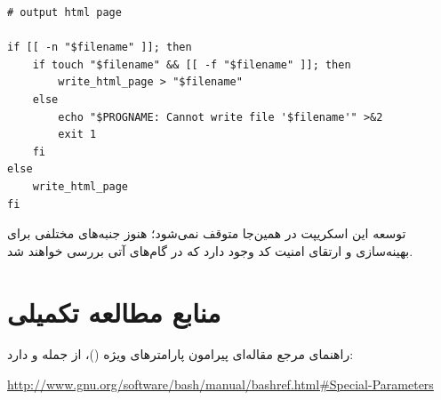 \begin{latin}
\begin{lstlisting}
# output html page

if [[ -n "$filename" ]]; then
    if touch "$filename" && [[ -f "$filename" ]]; then
        write_html_page > "$filename"
    else
        echo "$PROGNAME: Cannot write file '$filename'" >&2
        exit 1
    fi
else
    write_html_page
fi
\end{lstlisting}
\end{latin}

توسعه این اسکریپت در همین‌جا متوقف نمی‌شود؛ هنوز جنبه‌های مختلفی برای بهینه‌سازی و ارتقای امنیت کد وجود دارد که در گام‌های آتی بررسی خواهند شد.

\section{منابع مطالعه تکمیلی}

راهنمای مرجع  مقاله‌ای پیرامون پارامترهای ویژه ()، از جمله \cmd{\$\*} و \cmd{\$\@} دارد:

\begin{latin}
\url{http://www.gnu.org/software/bash/manual/bashref.html#Special-Parameters}
\end{latin}